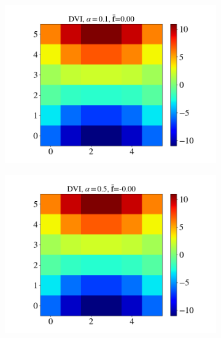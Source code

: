 \begin{itemize}
\begin{figure}[H]
\begin{subfigure}{0.32\columnwidth}
			\includegraphics[width=1.0\textwidth]{images/CD/Example7/5/T1_6_DVI_0.1.png}
		\end{subfigure}
		\begin{subfigure}{0.32\columnwidth}	
			\centering
			\includegraphics[width=1.0\textwidth]{images/CD/Example7/5/T1_6_DVI_0.5.png}
		\end{subfigure}
		\begin{subfigure}{0.32\columnwidth}	
			\centering

\end{subfigure}
\end{figure}
\end{itemize}
